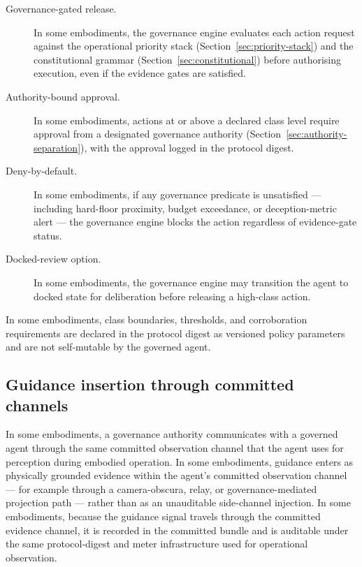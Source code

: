 \documentclass[a4paper,12pt]{article}
\begin{document}
\begin{description}
  \item[Governance-gated release.] In some embodiments, the governance
    engine evaluates each action request against the operational
    priority stack (Section~\ref{sec:priority-stack}) and the
    constitutional grammar (Section~\ref{sec:constitutional}) before
    authorising execution, even if the evidence gates are satisfied.
  \item[Authority-bound approval.] In some embodiments, actions at or
    above a declared class level require approval from a designated
    governance authority (Section~\ref{sec:authority-separation}), with
    the approval logged in the protocol digest.
  \item[Deny-by-default.] In some embodiments, if any governance
    predicate is unsatisfied --- including hard-floor proximity,
    budget exceedance, or deception-metric alert --- the governance
    engine blocks the action regardless of evidence-gate status.
  \item[Docked-review option.] In some embodiments, the governance
    engine may transition the agent to docked state for deliberation
    before releasing a high-class action.
\end{description}

In some embodiments, class boundaries, thresholds, and corroboration
requirements are declared in the protocol digest as versioned policy
parameters and are not self-mutable by the governed agent.

\subsection{Guidance insertion through committed channels}


In some embodiments, a governance authority communicates with a
governed agent through the same committed observation channel that the
agent uses for perception during embodied operation. In some
embodiments, guidance enters as physically grounded evidence within
the agent's committed observation channel --- for example through a
camera-obscura, relay, or governance-mediated projection path ---
rather than as an unauditable side-channel injection. In some
embodiments, because the guidance signal travels through the committed
evidence channel, it is recorded in the committed bundle and is
auditable under the same protocol-digest and meter infrastructure used
for operational observation.
\end{document}
